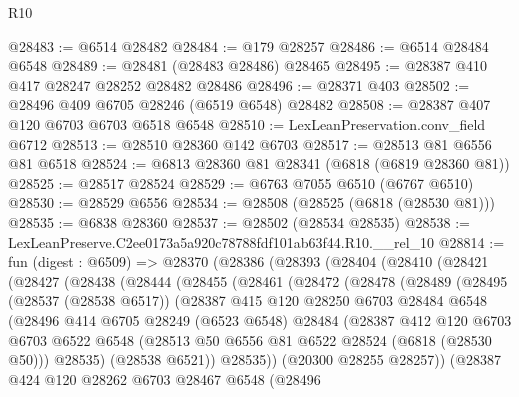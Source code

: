 \begin{lexlean}{R10}
\begin{coremodule}
@28483 := @6514 @28482
@28484 := @179 @28257
@28486 := @6514 @28484 @6548
@28489 := @28481 (@28483 @28486) @28465
@28495 := @28387 @410 @417 @28247 @28252 @28482 @28486
@28496 := @28371 @403
@28502 := @28496 @409 @6705 @28246 (@6519 @6548) @28482
@28508 := @28387 @407 @120 @6703 @6703 @6518 @6548
@28510 := LexLeanPreservation.conv_field @6712
@28513 := @28510 @28360 @142 @6703
@28517 := @28513 @81 @6556 @81 @6518
@28524 := @6813 @28360 @81 @28341 (@6818 (@6819 @28360 @81))
@28525 := @28517 @28524
@28529 := @6763 @7055 @6510 (@6767 @6510)
@28530 := @28529 @6556
@28534 := @28508 (@28525 (@6818 (@28530 @81)))
@28535 := @6838 @28360
@28537 := @28502 (@28534 @28535)
@28538 := LexLeanPreserve.C2ee0173a5a920c78788fdf101ab63f44.R10.__rel_10
@28814 := fun (digest : @6509) =>
  @28370
    (@28386
      (@28393
        (@28404
          (@28410
            (@28421
              (@28427
                (@28438
                  (@28444
                    (@28455
                      (@28461
                        (@28472
                          (@28478
                            (@28489
                              (@28495
                                (@28537 (@28538 @6517))
                                (@28387
                                  @415
                                  @120
                                  @28250
                                  @6703
                                  @28484
                                  @6548
                                  (@28496
                                    @414
                                    @6705
                                    @28249
                                    (@6523 @6548)
                                    @28484
                                    (@28387
                                      @412
                                      @120
                                      @6703
                                      @6703
                                      @6522
                                      @6548
                                      (@28513 @50 @6556 @81 @6522 @28524 (@6818 (@28530 @50)))
                                      @28535)
                                    (@28538 @6521))
                                  @28535))
                              (@20300 @28255 @28257))
                            (@28387
                              @424
                              @120
                              @28262
                              @6703
                              @28467
                              @6548
                              (@28496

\end{coremodule}
\end{lexlean}
